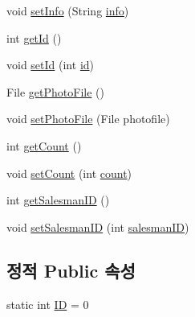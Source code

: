\begin{DoxyCompactItemize}
\item 
void \hyperlink{classpkg_1_1_product_a1e1baf71e00cde4a2ef6c36ec807b697}{set\+Info} (String \hyperlink{classpkg_1_1_product_ade3d909a0e7d15ec98c2f27eecd637cd}{info})
\item 
int \hyperlink{classpkg_1_1_product_a2f65335afe35080fa3402838b17d092e}{get\+Id} ()
\item 
void \hyperlink{classpkg_1_1_product_a996243e4823ae5f76f58e30a03d34eb9}{set\+Id} (int \hyperlink{classpkg_1_1_product_ac7846687b2d11faba3be1395fcbbab72}{id})
\item 
File \hyperlink{classpkg_1_1_product_a764578798cef5634d2af3044ab922977}{get\+Photo\+File} ()
\item 
void \hyperlink{classpkg_1_1_product_a5e82724d52edee89a9d1b27c10ef6c40}{set\+Photo\+File} (File photofile)
\item 
int \hyperlink{classpkg_1_1_product_ab7dd82a1b245dba43a64cd232f3665f6}{get\+Count} ()
\item 
void \hyperlink{classpkg_1_1_product_acb0a299e85f03854235433410489ab66}{set\+Count} (int \hyperlink{classpkg_1_1_product_ac136af1e8637edc22218dd9c3383266b}{count})
\item 
int \hyperlink{classpkg_1_1_product_a5f82183f3895907190290282addf4b93}{get\+Salesman\+ID} ()
\item 
void \hyperlink{classpkg_1_1_product_ac88412453ad90154a2ce712df900149f}{set\+Salesman\+ID} (int \hyperlink{classpkg_1_1_product_aecf411b201022fca17571e9afbc76747}{salesman\+ID})
\end{DoxyCompactItemize}
\subsection*{정적 Public 속성}
\begin{DoxyCompactItemize}
\item 
static int \hyperlink{classpkg_1_1_product_a228b3c9d89ad6a4f6637bf1f6f74ff64}{ID} = 0
\end{DoxyCompactItemize}
